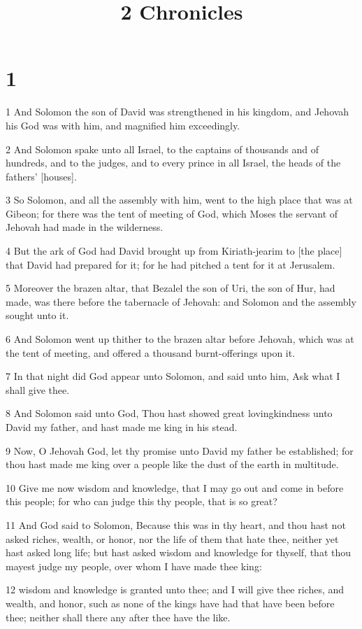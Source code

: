 

\title{2 Chronicles}

\chapter{1}

\par 1 And Solomon the son of David was strengthened in his kingdom, and Jehovah his God was with him, and magnified him exceedingly.
\par 2 And Solomon spake unto all Israel, to the captains of thousands and of hundreds, and to the judges, and to every prince in all Israel, the heads of the fathers' [houses].
\par 3 So Solomon, and all the assembly with him, went to the high place that was at Gibeon; for there was the tent of meeting of God, which Moses the servant of Jehovah had made in the wilderness.
\par 4 But the ark of God had David brought up from Kiriath-jearim to [the place] that David had prepared for it; for he had pitched a tent for it at Jerusalem.
\par 5 Moreover the brazen altar, that Bezalel the son of Uri, the son of Hur, had made, was there before the tabernacle of Jehovah: and Solomon and the assembly sought unto it.
\par 6 And Solomon went up thither to the brazen altar before Jehovah, which was at the tent of meeting, and offered a thousand burnt-offerings upon it.
\par 7 In that night did God appear unto Solomon, and said unto him, Ask what I shall give thee.
\par 8 And Solomon said unto God, Thou hast showed great lovingkindness unto David my father, and hast made me king in his stead.
\par 9 Now, O Jehovah God, let thy promise unto David my father be established; for thou hast made me king over a people like the dust of the earth in multitude.
\par 10 Give me now wisdom and knowledge, that I may go out and come in before this people; for who can judge this thy people, that is so great?
\par 11 And God said to Solomon, Because this was in thy heart, and thou hast not asked riches, wealth, or honor, nor the life of them that hate thee, neither yet hast asked long life; but hast asked wisdom and knowledge for thyself, that thou mayest judge my people, over whom I have made thee king:
\par 12 wisdom and knowledge is granted unto thee; and I will give thee riches, and wealth, and honor, such as none of the kings have had that have been before thee; neither shall there any after thee have the like.
